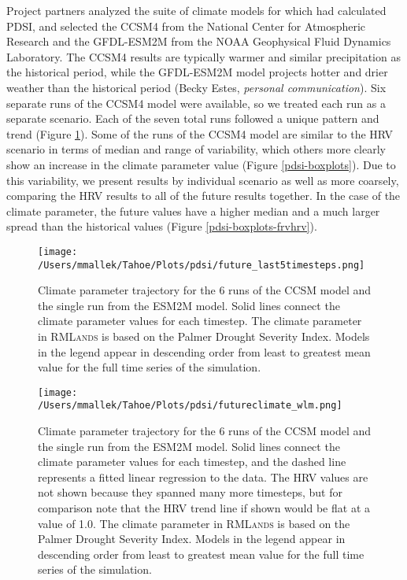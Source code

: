 \documentclass[12pt]{article}
\begin{document}
\begin{spacing}{1}
Project partners analyzed the suite of climate models for which \citet{Cook2014} had calculated PDSI, and selected the CCSM4 from the National Center for Atmospheric Research and the GFDL-ESM2M from the NOAA Geophysical Fluid Dynamics Laboratory. The CCSM4 results are typically warmer and similar precipitation as the historical period, while the GFDL-ESM2M model projects hotter and drier weather than the historical period (Becky Estes, \emph{personal communication}). Six separate runs of the CCSM4 model were available, so we treated each run as a separate scenario. Each of the seven total runs followed a unique pattern and trend (Figure \ref{pdsi-lm}). Some of the runs of the CCSM4 model are similar to the HRV scenario in terms of median and range of variability, which others more clearly show an increase in the climate parameter value (Figure \ref{pdsi-boxplots}). Due to this variability, we present results by individual scenario as well as more coarsely, comparing the HRV results to all of the future results together. In the case of the climate parameter, the future values have a higher median and a much larger spread than the historical values (Figure \ref{pdsi-boxplots-frvhrv}).



\begin{figure}[!htbp]
\centering
\texttt{[image: /Users/mmallek/Tahoe/Plots/pdsi/future\_last5timesteps.png]}
\caption{Climate parameter trajectory for the 6 runs of the CCSM model and the single run from the ESM2M model. Solid lines connect the climate parameter values for each timestep. The climate parameter in \textsc{RMLands} is based on the Palmer Drought Severity Index. Models in the legend appear in descending order from least to greatest mean value for the full time series of the simulation.} 
\label{pdsi-lm}
\end{figure}

\begin{figure}[!htbp]
\centering
\texttt{[image: /Users/mmallek/Tahoe/Plots/pdsi/futureclimate\_wlm.png]}
\caption{Climate parameter trajectory for the 6 runs of the CCSM model and the single run from the ESM2M model. Solid lines connect the climate parameter values for each timestep, and the dashed line represents a fitted linear regression to the data. The HRV values are not shown because they spanned many more timesteps, but for comparison note that the HRV trend line if shown would be flat at a value of 1.0. The climate parameter in \textsc{RMLands} is based on the Palmer Drought Severity Index. Models in the legend appear in descending order from least to greatest mean value for the full time series of the simulation.} 
\label{pdsi-final5}
\end{figure}


\end{spacing}
\end{document}
